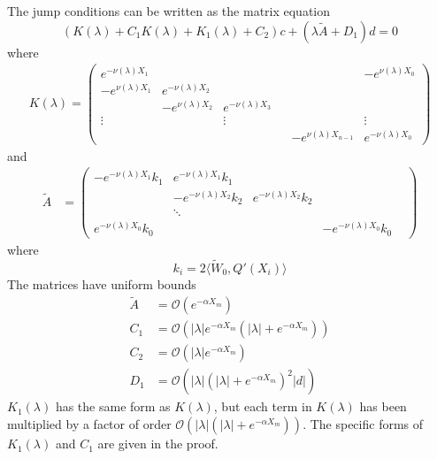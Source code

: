\documentclass[thesis.tex]{subfiles}
\begin{document}
\begin{lemma}
The jump conditions can be written as the matrix equation
\begin{equation}\label{matrixjumpc}
(K(\lambda) + C_1 K(\lambda) + K_1(\lambda) + C_2) c + (\lambda \tilde{A} + D_1) d = 0
\end{equation}
where
\begin{align*}
K(\lambda) =  
\begin{pmatrix}
e^{-\nu(\lambda)X_1} & & & & & -e^{\nu(\lambda)X_0} \\
-e^{\nu(\lambda)X_1} & e^{-\nu(\lambda)X_2} \\
& -e^{\nu(\lambda)X_2} & e^{-\nu(\lambda)X_3} \\
\vdots & & \vdots & &&  \vdots \\
& & & & -e^{\nu(\lambda)X_{n-1}} & e^{-\nu(\lambda)X_0}
\end{pmatrix}
\end{align*}
and
\begin{align*}
\tilde{A} &= \begin{pmatrix}
-e^{-\nu(\lambda)X_1} k_1 & e^{-\nu(\lambda)X_1} k_1 \\
& -e^{-\nu(\lambda)X_2} k_2 & e^{-\nu(\lambda)X_2} k_2 \\
& \ddots \\
e^{-\nu(\lambda)X_0} k_0 & &  & -e^{-\nu(\lambda)X_0} k_0 & 
\end{pmatrix}
\end{align*}
where 
\begin{equation}\label{defki}
k_i = 2 \langle \tilde{W}_0, Q'(X_i) \rangle
\end{equation}
The matrices have uniform bounds
\begin{align*}
\tilde{A} &= \mathcal{O}(e^{-\alpha X_m}) \\
C_1 &= \mathcal{O}(|\lambda|e^{-\alpha X_m}(|\lambda| + e^{-\alpha X_m})) \\
C_2 &= \mathcal{O}(|\lambda|e^{-\alpha X_m}) \\
D_1 &= \mathcal{O}(|\lambda|(|\lambda| + e^{-\alpha X_m})^2|d|)
\end{align*}
$K_1(\lambda)$ has the same form as $K(\lambda)$, but each term in $K(\lambda)$ has been multiplied by a factor of order $\mathcal{O}(|\lambda|(|\lambda| + e^{-\alpha X_m}))$. The specific forms of $K_1(\lambda)$ and $C_1$ are given in the proof.


\end{lemma}
\end{document}
